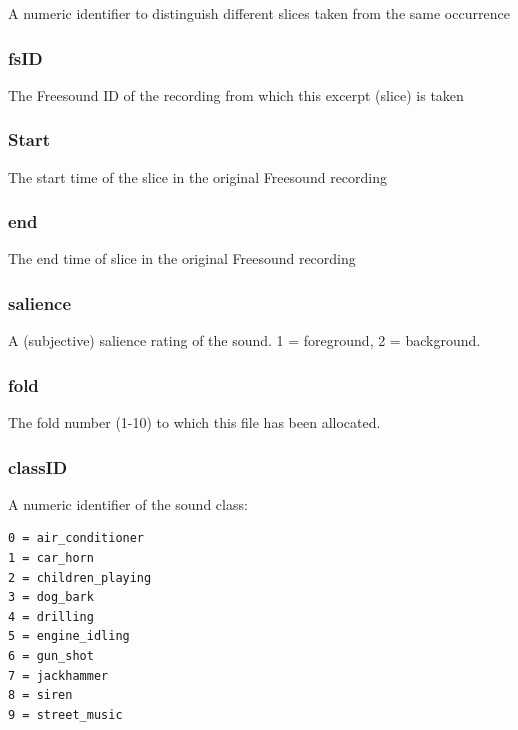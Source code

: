 A numeric identifier to distinguish different slices taken from the same
occurrence

\hypertarget{fsid}{%
\subsubsection{fsID}\label{fsid}}

The Freesound ID of the recording from which this excerpt (slice) is
taken

\hypertarget{start}{%
\subsubsection{Start}\label{start}}

The start time of the slice in the original Freesound recording

\hypertarget{end}{%
\subsubsection{end}\label{end}}

The end time of slice in the original Freesound recording

\hypertarget{salience}{%
\subsubsection{salience}\label{salience}}

A (subjective) salience rating of the sound. 1 = foreground, 2 =
background.

\hypertarget{fold}{%
\subsubsection{fold}\label{fold}}

The fold number (1-10) to which this file has been allocated.

\hypertarget{classid}{%
\subsubsection{classID}\label{classid}}

A numeric identifier of the sound class:

\begin{verbatim}
0 = air_conditioner
1 = car_horn
2 = children_playing
3 = dog_bark
4 = drilling
5 = engine_idling
6 = gun_shot
7 = jackhammer
8 = siren
9 = street_music
\end{verbatim}

